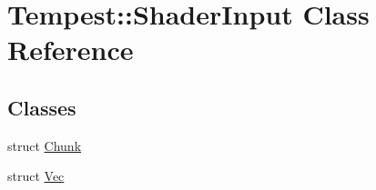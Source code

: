 \hypertarget{class_tempest_1_1_shader_input}{\section{Tempest\+:\+:Shader\+Input Class Reference}
\label{class_tempest_1_1_shader_input}
}
\subsection*{Classes}
\begin{DoxyCompactItemize}
\item 
struct \hyperlink{struct_tempest_1_1_shader_input_1_1_chunk}{Chunk}
\item 
struct \hyperlink{struct_tempest_1_1_shader_input_1_1_vec}{Vec}
\end{DoxyCompactItemize}
